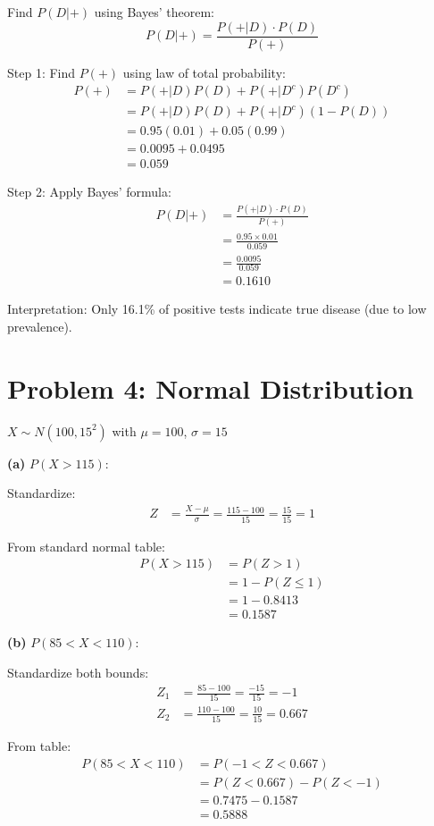 \documentclass[10pt,twocolumn]{article}
\begin{document}
Find $P(D|+)$ using Bayes' theorem:
$$P(D|+) = \frac{P(+|D) \cdot P(D)}{P(+)}$$

Step 1: Find $P(+)$ using law of total probability:
\begin{align*}
P(+) &= P(+|D)P(D) + P(+|D^c)P(D^c) \\
&= P(+|D)P(D) + P(+|D^c)(1-P(D)) \\
&= 0.95(0.01) + 0.05(0.99) \\
&= 0.0095 + 0.0495 \\
&= 0.059
\end{align*}

Step 2: Apply Bayes' formula:
\begin{align*}
P(D|+) &= \frac{P(+|D) \cdot P(D)}{P(+)} \\
&= \frac{0.95 \times 0.01}{0.059} \\
&= \frac{0.0095}{0.059} \\
&= \boxed{0.1610}
\end{align*}

Interpretation: Only 16.1\% of positive tests indicate true disease (due to low prevalence).

\section*{Problem 4: Normal Distribution}

$X \sim N(100, 15^2)$ with $\mu = 100$, $\sigma = 15$

\textbf{(a)} $P(X > 115)$:

Standardize:
\begin{align*}
Z &= \frac{X - \mu}{\sigma} = \frac{115-100}{15} = \frac{15}{15} = 1
\end{align*}

From standard normal table:
\begin{align*}
P(X > 115) &= P(Z > 1) \\
&= 1 - P(Z \leq 1) \\
&= 1 - 0.8413 \\
&= \boxed{0.1587}
\end{align*}

\textbf{(b)} $P(85 < X < 110)$:

Standardize both bounds:
\begin{align*}
Z_1 &= \frac{85-100}{15} = \frac{-15}{15} = -1 \\
Z_2 &= \frac{110-100}{15} = \frac{10}{15} = 0.667
\end{align*}

From table:
\begin{align*}
P(85 < X < 110) &= P(-1 < Z < 0.667) \\
&= P(Z < 0.667) - P(Z < -1) \\
&= 0.7475 - 0.1587 \\
&= \boxed{0.5888}
\end{align*}
\end{document}
